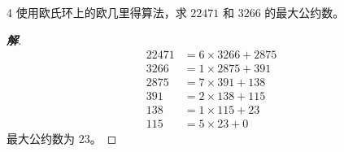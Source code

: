 \documentclass[12pt, a4paper]{article}
\newenvironment{solution}{
    \begin{proof}[\textbf{解}]
}{
    \end{proof}
}
\begin{document}
\begin{problem}{4}
    使用欧氏环上的欧几里得算法，求 $22471$ 和 $3266$ 的最大公约数。
\end{problem}
\begin{solution}
    \begin{align*}
        22471 &= 6 \times 3266 + 2875 \\
        3266 &= 1 \times 2875 + 391 \\
        2875 &= 7 \times 391 + 138 \\
        391 &= 2 \times 138 + 115 \\
        138 &= 1 \times 115 + 23 \\
        115 &= 5 \times 23 + 0
    \end{align*}
    最大公约数为 $23$。
\end{solution}
\end{document}
